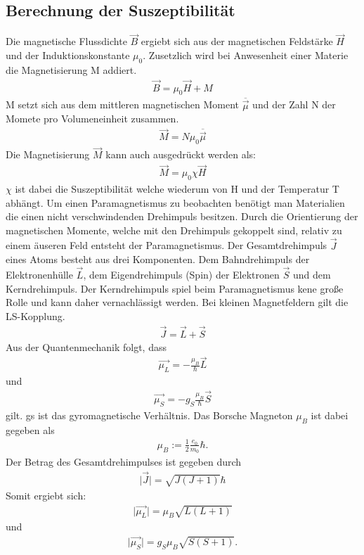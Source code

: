 \subsection{Berechnung der Suszeptibilität}
Die magnetische Flussdichte $\vec{B}$ ergiebt sich aus der magnetischen Feldstärke $\vec{H}$ und der Induktionskonstante $\mu_0$.
Zusetzlich wird bei Anwesenheit einer Materie die Magnetisierung M addiert.
\begin{align*}
  \vec{B}=\mu_0 \vec{H}+M
\end{align*}
M setzt sich aus dem mittleren magnetischen Moment $ \overline{\vec{\mu}}$ und der Zahl N der Momete pro Volumeneinheit zusammen.
\begin{align*}
  \vec{M}=N\mu_0\overline{\vec{\mu}}
\end{align*}
Die Magnetisierung $\vec{M}$ kann auch ausgedrückt werden als:
\begin{align*}
  \vec{M}=\mu_0\chi\vec{H}
\end{align*}
$\chi$ ist dabei die Suszeptibilität welche wiederum von H und der Temperatur T abhängt.
Um einen Paramagnetismus zu beobachten benötigt man Materialien die einen nicht verschwindenden Drehimpuls besitzen.
Durch die Orientierung der magnetischen Momente, welche mit den Drehimpuls gekoppelt sind, relativ zu einem äuseren Feld entsteht der Paramagnetismus.
Der Gesamtdrehimpuls $\vec{J}$ eines Atoms besteht aus drei Komponenten. Dem Bahndrehimpuls der Elektronenhülle $\vec{L}$, dem Eigendrehimpuls (Spin) der Elektronen $\vec{S}$ und dem Kerndrehimpuls. Der Kerndrehimpuls spiel beim Paramagnetismus kene große Rolle und kann daher vernachlässigt werden.
Bei kleinen Magnetfeldern gilt die LS-Kopplung.
\begin{align*}
  \vec{J}=\vec{L}+\vec{S}
\end{align*}
Aus der Quantenmechanik folgt, dass
\begin{align*}
  \vec{\mu_L}=-\frac{\mu_B}{\hbar}\vec{L}
\end{align*}
und
\begin{align*}
  \vec{\mu_S}=-g_S\frac{\mu_B}{\hbar}\vec{S}
\end{align*}
gilt. gs ist das gyromagnetische Verhältnis. Das Borsche Magneton $\mu_B$ ist dabei gegeben als
\begin{align*}
  \mu_B:=\frac{1}{2}\frac{e_0}{m_0}\hbar.
\end{align*}
Der Betrag des Gesamtdrehimpulses ist gegeben durch
\begin{align*}
  \bigl|\vec{J}\bigr|=\sqrt{J(J+1)}\hbar
\end{align*}
Somit ergiebt sich:
\begin{align*}
  \bigl|\vec{\mu_L}\bigr|=\mu_B\sqrt{L(L+1)}
\end{align*}
und
\begin{align*}
    \bigl|\vec{\mu_S}\bigr|=g_S\mu_B\sqrt{S(S+1)}.
\end{align*}

